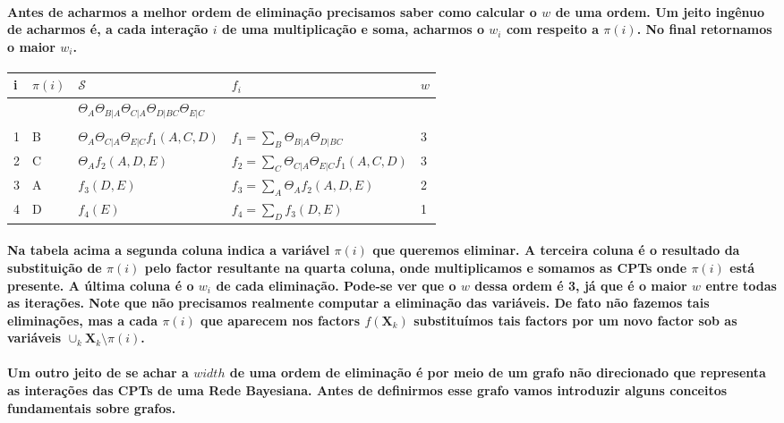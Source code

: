 \documentclass[a4paper,10pt]{article}
\theoremstyle{plain}
\begin{document}
\paragraph{
  Antes de acharmos a melhor ordem de eliminação precisamos saber como calcular o $w$ de uma ordem.
  Um jeito ingênuo de acharmos é, a cada interação $i$ de uma multiplicação e soma, acharmos o 
  $w_i$ com respeito a $\pi(i)$. No final retornamos o maior $w_i$. 
}

\begin{table}[h]
  \begin{center}
    \begin{tabular}{*{4}{l|} l}
      i & $\pi(i)$ & $\mathcal{S}$ & $f_i$ & $w$ \\
      \hline
      & & $\Theta_A \Theta_{B|A} \Theta_{C|A} \Theta_{D|BC} \Theta_{E|C}$ & & \\
      & & & & \\
      1 & B & $\Theta_A \Theta_{C|A} \Theta_{E|C} f_1(A, C, D)$ & $f_1 = \sum_B \Theta_{B|A} \Theta_{D|BC}$ & 3 \\
      2 & C & $\Theta_A f_2(A, D, E)$ & $f_2 = \sum_C \Theta_{C|A} \Theta_{E|C} f_1(A, C, D)$ & 3 \\
      3 & A & $f_3(D, E)$ & $f_3 = \sum_A \Theta_A f_2(A, D, E)$ & 2 \\
      4 & D & $f_4(E)$ & $f_4 = \sum_D f_3(D, E)$ & 1 \\
    \end{tabular}
  \end{center}
\end{table}

\paragraph{
  Na tabela acima a segunda coluna indica a variável $\pi(i)$ que queremos eliminar. A terceira 
  coluna é o resultado da substituição de $\pi(i)$ pelo factor resultante na quarta coluna, onde
  multiplicamos e somamos as CPTs onde $\pi(i)$ está presente. A última coluna é o $w_i$ de cada
  eliminação. Pode-se ver que o $w$ dessa ordem é 3, já que é o maior $w$ entre todas as iterações.
  Note que não precisamos realmente computar a eliminação das variáveis. De fato não fazemos tais
  eliminações, mas a cada $\pi(i)$ que aparecem nos factors $f(\textbf{X}_k)$ substituímos tais
  factors por um novo factor sob as variáveis $\cup_k \textbf{X}_k \setminus {\pi(i)}$.
}

\paragraph{
  Um outro jeito de se achar a $width$ de uma ordem de eliminação é por meio de um grafo não 
  direcionado que representa as interações das CPTs de uma Rede Bayesiana. Antes de definirmos
  esse grafo vamos introduzir alguns conceitos fundamentais sobre grafos.
}
\end{document}
